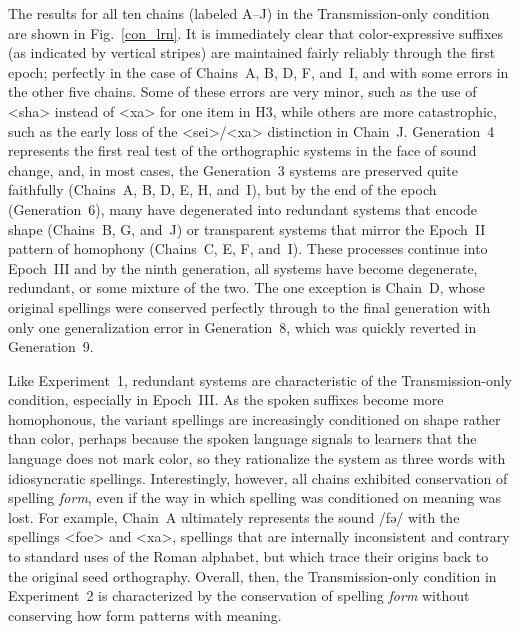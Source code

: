 \documentclass[doc,biblatex]{apa7}
\begin{document}
The results for all ten chains (labeled A--J) in the Transmission-only condition are shown in Fig.~\ref{con_lrn}. It is immediately clear that color-expressive suffixes (as indicated by vertical stripes) are maintained fairly reliably through the first epoch; perfectly in the case of Chains~A, B, D, F, and~I, and with some errors in the other five chains. Some of these errors are very minor, such as the use of <sha> instead of <xa> for one item in H3, while others are more catastrophic, such as the early loss of the <sei>/<xa> distinction in Chain~J. Generation~4 represents the first real test of the orthographic systems in the face of sound change, and, in most cases, the Generation~3 systems are preserved quite faithfully (Chains~A, B, D, E, H, and~I), but by the end of the epoch (Generation~6), many have degenerated into redundant systems that encode shape (Chains~B, G, and~J) or transparent systems that mirror the Epoch~II pattern of homophony (Chains~C, E, F, and~I). These processes continue into Epoch~III and by the ninth generation, all systems have become degenerate, redundant, or some mixture of the two. The one exception is Chain~D, whose original spellings were conserved perfectly through to the final generation with only one generalization error in Generation~8, which was quickly reverted in Generation~9.

Like Experiment~1, redundant systems are characteristic of the Transmission-only condition, especially in Epoch~III. As the spoken suffixes become more homophonous, the variant spellings are increasingly conditioned on shape rather than color, perhaps because the spoken language signals to learners that the language does not mark color, so they rationalize the system as three words with idiosyncratic spellings. Interestingly, however, all chains exhibited conservation of spelling \textit{form}, even if the way in which spelling was conditioned on meaning was lost. For example, Chain~A ultimately represents the sound /fə/ with the spellings <foe> and <xa>, spellings that are internally inconsistent and contrary to standard uses of the Roman alphabet, but which trace their origins back to the original seed orthography. Overall, then, the Transmission-only condition in Experiment~2 is characterized by the conservation of spelling \textit{form} without conserving how form patterns with meaning.
\end{document}
